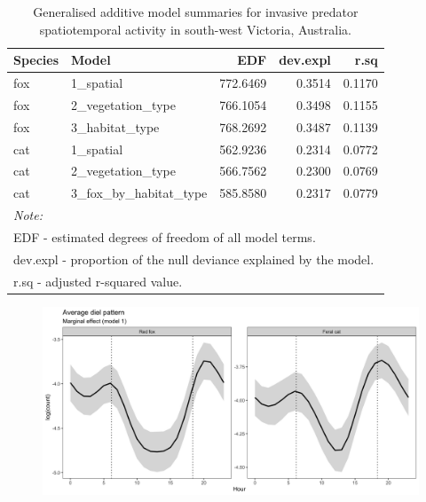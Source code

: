 \documentclass[11pt,a4paper,titlepage,twoside,openright]{style/unimelbthesis}
\begin{document}
\begin{mainmatter}
\begingroup\fontsize{10}{12}\selectfont
\begin{longtable}[t]{llrrr}
\caption{\label{tab:diel-tab-fits}Generalised additive model summaries for invasive predator spatiotemporal activity in south-west Victoria, Australia.}\\
\toprule
Species & Model & EDF & dev.expl & r.sq\\
\midrule
fox & 1\_spatial & 772.6469 & 0.3514 & 0.1170\\
fox & 2\_vegetation\_type & 766.1054 & 0.3498 & 0.1155\\
fox & 3\_habitat\_type & 768.2692 & 0.3487 & 0.1139\\
cat & 1\_spatial & 562.9236 & 0.2314 & 0.0772\\
cat & 2\_vegetation\_type & 566.7562 & 0.2300 & 0.0769\\
\addlinespace
cat & 3\_fox\_by\_habitat\_type & 585.8580 & 0.2317 & 0.0779\\
\bottomrule
\multicolumn{5}{l}{\rule{0pt}{1em}\textit{Note: }}\\
\multicolumn{5}{l}{\rule{0pt}{1em}EDF - estimated degrees of freedom of all model terms.}\\
\multicolumn{5}{l}{\rule{0pt}{1em}dev.expl - proportion of the null deviance explained by the model. }\\
\multicolumn{5}{l}{\rule{0pt}{1em}r.sq -  adjusted r-squared value.}\\
\end{longtable}
\endgroup{}

\newpage
\begin{figure}

{\centering \includegraphics[width=1\linewidth]{figure/avg_diel_predator} 

}


\end{figure}
\end{mainmatter}
\end{document}
